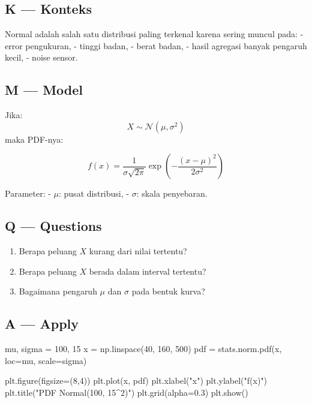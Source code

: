 \documentclass[
  letterpaper,
  DIV=11,
  numbers=noendperiod]{scrreprt}
\newenvironment{Shaded}{\begin{snugshade}}{\end{snugshade}}
\newcommand{\DecValTok}[1]{\textcolor[rgb]{0.68,0.00,0.00}{#1}}
\newcommand{\FloatTok}[1]{\textcolor[rgb]{0.68,0.00,0.00}{#1}}
\newcommand{\NormalTok}[1]{\textcolor[rgb]{0.00,0.23,0.31}{#1}}
\newcommand{\OperatorTok}[1]{\textcolor[rgb]{0.37,0.37,0.37}{#1}}
\newcommand{\StringTok}[1]{\textcolor[rgb]{0.13,0.47,0.30}{#1}}
\providecommand{\tightlist}{%
  \setlength{\itemsep}{0pt}\setlength{\parskip}{0pt}}
\begin{document}
\subsection{K --- Konteks}\label{k-konteks-21}

Normal adalah salah satu distribusi paling terkenal karena sering muncul
pada: - error pengukuran, - tinggi badan, - berat badan, - hasil
agregasi banyak pengaruh kecil, - noise sensor.

\subsection{M --- Model}\label{m-model-21}

Jika: \[
X \sim \mathcal{N}(\mu, \sigma^2)
\] maka PDF-nya:

\[
f(x)=\frac{1}{\sigma \sqrt{2\pi}}\exp\left(-\frac{(x-\mu)^2}{2\sigma^2}\right)
\]

Parameter: - \(\mu\): pusat distribusi, - \(\sigma\): skala penyebaran.

\subsection{Q --- Questions}\label{q-questions-21}

\begin{enumerate}
\def\labelenumi{\arabic{enumi}.}
\tightlist
\item
  Berapa peluang \(X\) kurang dari nilai tertentu?
\item
  Berapa peluang \(X\) berada dalam interval tertentu?
\item
  Bagaimana pengaruh \(\mu\) dan \(\sigma\) pada bentuk kurva?
\end{enumerate}

\subsection{A --- Apply}\label{a-apply-21}

\begin{Shaded}
\begin{Highlighting}[]
\NormalTok{mu, sigma }\OperatorTok{=} \DecValTok{100}\NormalTok{, }\DecValTok{15}
\NormalTok{x }\OperatorTok{=}\NormalTok{ np.linspace(}\DecValTok{40}\NormalTok{, }\DecValTok{160}\NormalTok{, }\DecValTok{500}\NormalTok{)}
\NormalTok{pdf }\OperatorTok{=}\NormalTok{ stats.norm.pdf(x, loc}\OperatorTok{=}\NormalTok{mu, scale}\OperatorTok{=}\NormalTok{sigma)}

\NormalTok{plt.figure(figsize}\OperatorTok{=}\NormalTok{(}\DecValTok{8}\NormalTok{,}\DecValTok{4}\NormalTok{))}
\NormalTok{plt.plot(x, pdf)}
\NormalTok{plt.xlabel(}\StringTok{"x"}\NormalTok{)}
\NormalTok{plt.ylabel(}\StringTok{"f(x)"}\NormalTok{)}
\NormalTok{plt.title(}\StringTok{"PDF Normal(100, 15\^{}2)"}\NormalTok{)}
\NormalTok{plt.grid(alpha}\OperatorTok{=}\FloatTok{0.3}\NormalTok{)}
\NormalTok{plt.show()}
\end{Highlighting}
\end{Shaded}
\end{document}
